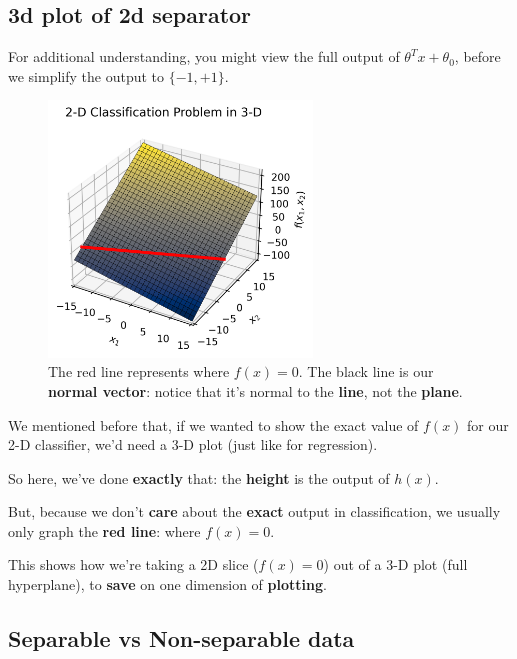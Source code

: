     \subsection{3d plot of 2d separator}
    
        For additional understanding, you might view the full output of $\theta^T x + \theta_0$, before we simplify the output to $\{-1,+1\}$.
        
        \begin{figure}[H]
            \centering
            
            \includegraphics[width=70mm,scale=0.5]{images/classification_images/2d_classification_in_3d.png}
            \caption*{The red line represents where $f(x)=0$. The black line is our \textbf{normal vector}: notice that it's normal to the \textbf{line}, not the \textbf{plane}.}
        \end{figure}
        
        We mentioned before that, if we wanted to show the exact value of $f(x)$ for our 2-D classifier, we'd need a 3-D plot (just like for regression).
        
        So here, we've done \textbf{exactly} that: the \textbf{height} is the output of $h(x)$.
        
        But, because we don't \textbf{care} about the \textbf{exact} output in classification, we usually only graph the \textbf{red line}: where $f(x)=0$.
        
        This shows how we're taking a 2D slice ($f(x)=0$) out of a 3-D plot (full hyperplane), to \textbf{save} on one dimension of \textbf{plotting}.
    
    \subsection{Separable vs Non-separable data}
    
